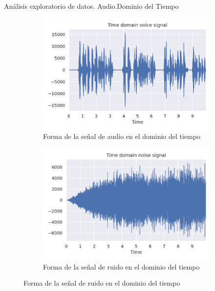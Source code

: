 \begin{frame}{Análisis exploratorio de datos. Audio.\newline Dominio del Tiempo}
	\vspace*{-2pt}
	\begin{figure}
		\centering
		\begin{subfigure}[t]{0.5\textwidth}
			\centering
			\includegraphics[width=0.9\columnwidth]{../figures/audio_book_time.png}
			\vspace*{-5pt}
			\caption{Forma de la señal de audio en el dominio del tiempo}
			\label{fig: voice_time}
		\end{subfigure}%
		\hspace*{10pt}
		\begin{subfigure}[t]{0.5\textwidth}
			\centering
			\includegraphics[width=0.9\columnwidth]{../figures/noise_time.png}
			\vspace*{-5pt}
			\caption{Forma de la señal de ruido en el dominio del tiempo}
			\label{fig: noise_time}
		\end{subfigure}

\end{figure}
\end{frame}
